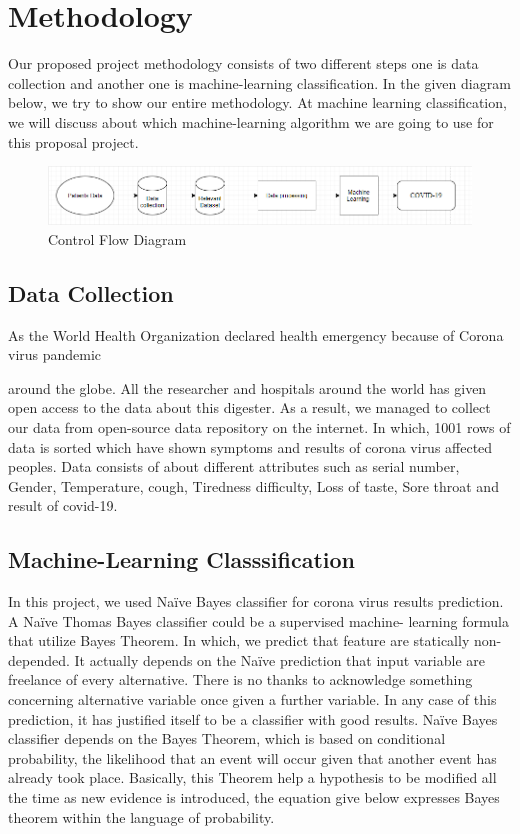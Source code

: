 \documentclass[conference]{IEEEtran}
\begin{document}
\section{Methodology}

Our proposed project methodology consists of two different steps one is data collection and another one is machine-learning classification. In the given diagram below, we try to show our entire methodology. At machine learning classification, we will discuss about which machine-learning algorithm we are going to use for this proposal project.


\begin{figure}[h!]
    \centering
    \includegraphics[scale=0.2]{flow.png}
    \caption{Control Flow Diagram}
    \label{fig:flow}
\end{figure}



\subsection{Data Collection}
As the World Health Organization declared health emergency because of Corona virus pandemic
 
around the globe. All the researcher and hospitals around the world has given open access to the data about this digester. As a result, we managed to collect our data from open-source data repository on the internet. In which, 1001 rows of data is sorted which have shown symptoms and results of corona virus affected peoples. Data consists of about different attributes such as serial number, Gender, Temperature, cough, Tiredness difficulty, Loss of taste, Sore throat and result of covid-19.


\subsection{Machine-Learning Classsification}
In this project, we used Naïve Bayes classifier for corona virus results prediction. A Naïve Thomas Bayes classifier could be a supervised machine- learning formula that utilize Bayes Theorem. In which, we predict that feature are statically non- depended. It actually depends on the Naïve prediction that input variable are freelance of every alternative. There is no thanks to acknowledge something concerning alternative variable once given a further variable. In any case of this prediction, it has justified itself to be a classifier with good results.
Naïve Bayes classifier depends on the Bayes Theorem, which is based on conditional probability, the likelihood that an event will occur given that another event has already took place. Basically, this Theorem help a hypothesis to be modified all the time as new evidence is introduced, the equation give below expresses Bayes theorem within the language of probability.
\end{document}
